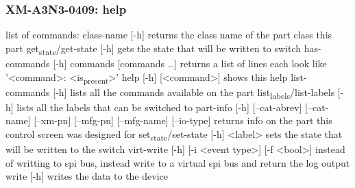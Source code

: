 \documentclass[11pt]{article}
\begin{document}
\subsubsection{XM-A3N3-0409: help}
\label{sec:org0622f33}
list of commands:
  class-name [-h]
    returns the class name of the part class this part
  get\textsubscript{state}/get-state [-h]
    gets the state that will be written to switch
  has-commands [-h] commands [commands \ldots{}]
    returns a list of lines each look like '<command>: <is\textsubscript{present}>'
  help [-h] [<command>]
    shows this help
  list-commands [-h]
    lists all the commands available on the part
  list\textsubscript{labels}/list-labels [-h]
    lists all the labels that can be switched to
  part-info  [-h] [--cat-abrev] [--cat-name] [--xm-pn] [--mfg-pn] [--mfg-name]
          [--io-type]
    returns info on the part this control screen was designed for
  set\textsubscript{state}/set-state [-h] <label>
    sets the state that will be written to the switch
  virt-write [-h] [-i <event type>] [-f <bool>]
    instead of writting to spi bus, instead write to a virtual spi bus
    and return the log output
  write [-h]
    writes the data to the device
\end{document}
